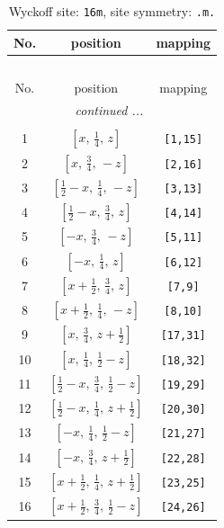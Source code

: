 \documentclass[fleqn,8pt]{jsarticle}
\begin{document}
\renewcommand{\arraystretch}{1.2}
\begin{longtable}{ccc}
\caption{Wyckoff site: {\tt 16m}, site symmetry: {\tt .m.}}
 \\
 \hline \hline
No. & position & mapping \\ \hline \endfirsthead

\multicolumn{2}{l}{\tablename\ \thetable{}} \\
 \hline \hline
No. & position & mapping \\ \hline \endhead

 \hline \hline
\multicolumn{2}{r}{\footnotesize\it continued ...} \\ \endfoot

 \hline \hline
\multicolumn{2}{r}{} \\ \endlastfoot

1 & $\left[ x,\, \frac{1}{4},\, z \right]$ & {\tt [1,15]} \\ \hline
2 & $\left[ x,\, \frac{3}{4},\, - z \right]$ & {\tt [2,16]} \\ \hline
3 & $\left[ \frac{1}{2} - x,\, \frac{1}{4},\, - z \right]$ & {\tt [3,13]} \\ \hline
4 & $\left[ \frac{1}{2} - x,\, \frac{3}{4},\, z \right]$ & {\tt [4,14]} \\ \hline
5 & $\left[ - x,\, \frac{3}{4},\, - z \right]$ & {\tt [5,11]} \\ \hline
6 & $\left[ - x,\, \frac{1}{4},\, z \right]$ & {\tt [6,12]} \\ \hline
7 & $\left[ x + \frac{1}{2},\, \frac{3}{4},\, z \right]$ & {\tt [7,9]} \\ \hline
8 & $\left[ x + \frac{1}{2},\, \frac{1}{4},\, - z \right]$ & {\tt [8,10]} \\ \hline
9 & $\left[ x,\, \frac{3}{4},\, z + \frac{1}{2} \right]$ & {\tt [17,31]} \\ \hline
10 & $\left[ x,\, \frac{1}{4},\, \frac{1}{2} - z \right]$ & {\tt [18,32]} \\ \hline
11 & $\left[ \frac{1}{2} - x,\, \frac{3}{4},\, \frac{1}{2} - z \right]$ & {\tt [19,29]} \\ \hline
12 & $\left[ \frac{1}{2} - x,\, \frac{1}{4},\, z + \frac{1}{2} \right]$ & {\tt [20,30]} \\ \hline
13 & $\left[ - x,\, \frac{1}{4},\, \frac{1}{2} - z \right]$ & {\tt [21,27]} \\ \hline
14 & $\left[ - x,\, \frac{3}{4},\, z + \frac{1}{2} \right]$ & {\tt [22,28]} \\ \hline
15 & $\left[ x + \frac{1}{2},\, \frac{1}{4},\, z + \frac{1}{2} \right]$ & {\tt [23,25]} \\ \hline
16 & $\left[ x + \frac{1}{2},\, \frac{3}{4},\, \frac{1}{2} - z \right]$ & {\tt [24,26]} \\
\end{longtable}
\end{document}

